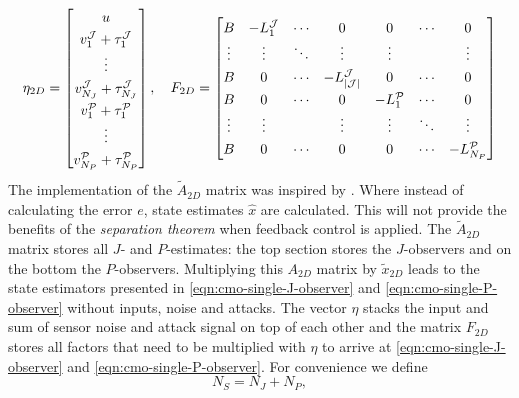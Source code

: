 \begin{equation}\label{eqn:2D-CMO-F-eta}
\renewcommand{\arraystretch}{1.3}
    \eta_{2D} = 
        \begin{bmatrix}
            u \\ v_1^{\mcJ} + \tau_1^{\mcJ} \\ \vdots \\ v_{N_J}^{\mcJ} + \tau_{N_J}^{\mcJ} \\ v_1^{\mcP} + \tau_1^{\mcP} \\ \vdots \\ v_{N_P}^{\mcP} + \tau_{N_P}^{\mcP}\\
        \end{bmatrix}, \quad 
        F_{2D} = 
        \begin{bmatrix}
            B & -L_1^{\mcJ} & \cdots & 0 & 0 & \cdots & 0 \\
            \vdots & \vdots & \ddots & \vdots & \vdots & & \vdots \\
            B & 0 & \cdots & -L_{\cJ}^{\mcJ} & 0 & \cdots & 0 \\
            B & 0 & \cdots & 0 & -L_{1}^{\mcP} & \cdots & 0 \\
            \vdots & \vdots & & \vdots & \vdots & \ddots & \vdots \\
            B & 0 & \cdots & 0 & 0 & \cdots & -L_{N_P}^{\mcP} \\
        \end{bmatrix}
\end{equation}
The implementation of the $\tilde{A}_{2D}$ matrix was inspired by \cite[Equation 16.10]{Hespanha2018LinearTheory}. Where instead of calculating the error $e$, state estimates $\hat{x}$ are calculated. This will not provide the benefits of the \textit{separation theorem} \cite[Theorem 16.12]{Hespanha2018LinearTheory} when feedback control is applied. The $\tilde
{A}_{2D}$ matrix stores  all $J$- and $P$-estimates: the top section stores the $J$-observers and on the bottom the $P$-observers. Multiplying this ${A}_{2D}$ matrix by $\tilde{x}_{2D}$ leads to the state estimators presented in \eqref{eqn:cmo-single-J-observer} and \eqref{eqn:cmo-single-P-observer} without inputs, noise and attacks. The vector $\eta$ stacks the input and sum of sensor noise and attack signal on top of each other and the matrix $F_{2D}$ stores all factors that need to be multiplied with $\eta$ to arrive at \eqref{eqn:cmo-single-J-observer} and \eqref{eqn:cmo-single-P-observer}. For convenience we define
\begin{equation*}
    N_S = N_J + N_P,
\end{equation*}
